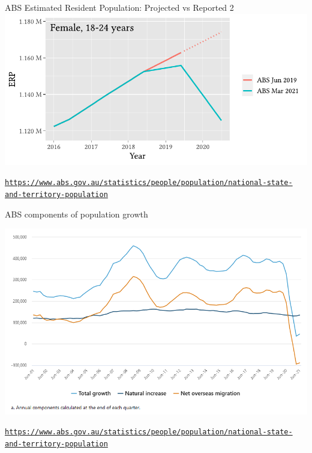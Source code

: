 \documentclass[aspectratio=169,12pt]{beamer} %
\begin{document}
\begin{frame}{ABS Estimated Resident Population: Projected vs Reported 2}
	\center\includegraphics[height=0.75\textheight]{ref/pops-f18-24.pdf}
	\begin{flushright}\tiny\texttt{\url{https://www.abs.gov.au/statistics/people/population/national-state-and-territory-population}}\end{flushright}
\end{frame}

\begin{frame}{ABS components of population growth}

	\center\includegraphics[height=0.75\textheight]{ref/pop-components.PNG}
	\begin{flushright}\tiny\texttt{\url{https://www.abs.gov.au/statistics/people/population/national-state-and-territory-population}}\end{flushright}
\end{frame}
\end{document}
